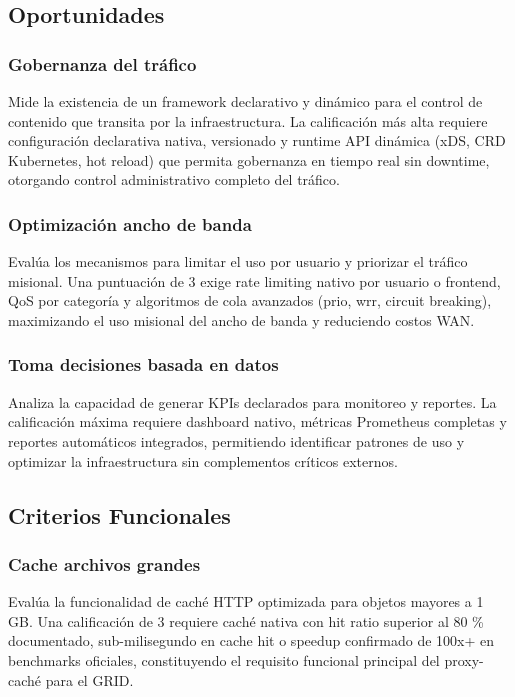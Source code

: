 \subsection{Oportunidades}

\subsubsection{Gobernanza del tráfico}

Mide la existencia de un framework declarativo y dinámico para el control de contenido que transita por la infraestructura. La calificación más alta requiere configuración declarativa nativa, versionado y runtime API dinámica (xDS, CRD Kubernetes, hot reload) que permita gobernanza en tiempo real sin downtime, otorgando control administrativo completo del tráfico.

\subsubsection{Optimización ancho de banda}

Evalúa los mecanismos para limitar el uso por usuario y priorizar el tráfico misional. Una puntuación de 3 exige rate limiting nativo por usuario o frontend, QoS por categoría y algoritmos de cola avanzados (prio, wrr, circuit breaking), maximizando el uso misional del ancho de banda y reduciendo costos WAN.

\subsubsection{Toma decisiones basada en datos}

Analiza la capacidad de generar KPIs declarados para monitoreo y reportes. La calificación máxima requiere dashboard nativo, métricas Prometheus completas y reportes automáticos integrados, permitiendo identificar patrones de uso y optimizar la infraestructura sin complementos críticos externos.

\subsection{Criterios Funcionales}

\subsubsection{Cache archivos grandes}

Evalúa la funcionalidad de caché HTTP optimizada para objetos mayores a 1 GB. Una calificación de 3 requiere caché nativa con hit ratio superior al 80 \% documentado, sub-milisegundo en cache hit o speedup confirmado de 100x+ en benchmarks oficiales, constituyendo el requisito funcional principal del proxy-caché para el GRID.

